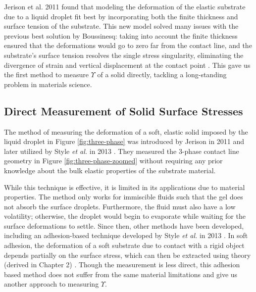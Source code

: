 Jerison et al. 2011 \cite{jerison2011deformation} found that modeling the deformation of the elastic substrate due to a liquid droplet fit best by incorporating both the finite thickness and surface tension of the substrate. This new model solved many issues with the previous best solution by Boussinesq: taking into account the finite thickness ensured that the deformations would go to zero far from the contact line, and the substrate's surface tension resolves the single stress singularity, eliminating the divergence of strain and vertical displacement at the contact point \cite{liang2018surface}. This gave us the first method to measure $ \Upsilon $ of a solid directly, tackling a long-standing problem in materials science.


\subsection{Direct Measurement of Solid Surface Stresses}
 The method of measuring the deformation of a soft, elastic solid imposed by the liquid droplet in Figure \ref{fig:three-phase} was introduced by Jerison in 2011 \cite{jerison2011deformation} and later utilized by Style \emph{et al.} in 2013 \cite{style2013universal}. They measured the 3-phase contact line geometry in Figure \ref{fig:three-phase-zoomed} without requiring any prior knowledge about the bulk elastic properties of the substrate material. 

While this technique is effective, it is limited in its applications due to material properties. The method only works for immiscible fluids such that the gel does not absorb the surface droplets. Furthermore, the fluid must also have a low volatility; otherwise, the droplet would begin to evaporate while waiting for the surface deformations to settle. Since then, other methods have been developed, including an adhesion-based technique developed by Style \textit{et al.} in 2013 \cite{style2013surface,xu2016surface,jensen2015wetting,mondal2015estimation,jagota2012surface,nadermann2013solid,park2014visualization}. In soft adhesion, the deformation of a soft substrate due to contact with a rigid object depends partially on the surface stress, which can then be extracted using theory (derived in Chapter 2) \cite{tian2018measure,CaoZhen2014EAaW,caoAdhesion}. Though the measurement is less direct, this adhesion based method does not suffer from the same material limitations and give us another approach to measuring $ \Upsilon $.  



